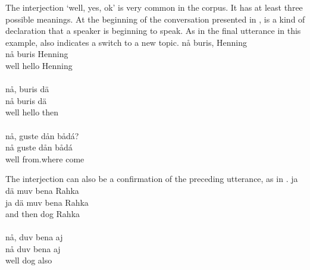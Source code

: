 
\FB

The interjection  ‘well, yes, ok’ is very common in the corpus. It has at least three possible meanings. At the beginning of the conversation presented in ,  is a kind of declaration that a speaker is beginning to speak. As in the final utterance in this example,  also indicates a switch to a new topic. 
\ea\label{particleEx3}
\glll	{} nå buris, Henning\\
	{} nå buris Henning\\
	{} well hello Henning\\\nopagebreak
{}\\	%
\glll	{} nå, buris dä\\
	{} nå buris dä\\
	{} well hello then\\\nopagebreak
{}\\	%
\glll	{} nå, guste dån bådá?\\
	{} nå guste dån bådá\\
	{} well from.where  come\BS{}\\\nopagebreak
{}	
\z


The interjection  can also be a confirmation of the preceding utterance, as in .
\ea\label{particleEx4}
\glll	{} ja dä muv bena Rahka\\
	{} ja dä muv bena Rahka\\
	{} and then  dog\BS{} Rahka\\\nopagebreak
{}\\
\glll	{} nå, duv bena aj\\
	{} nå duv bena aj\\
	{} well  dog\BS{} also\\\nopagebreak
{}	
\z

